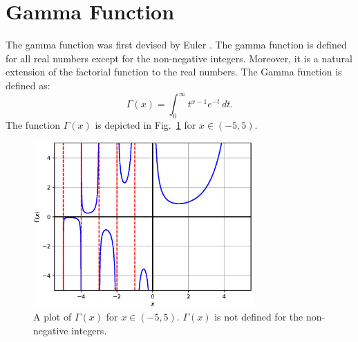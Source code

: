 \documentclass{article}
\theoremstyle{theorem}
\theoremstyle{definition}
\begin{document}
\section{Gamma Function}
The gamma function was first devised by Euler \cite{euler1738}. The gamma function is defined for all real numbers except for the non-negative integers. Moreover, it is a natural extension of the factorial function to the real numbers. The Gamma function is defined as:
\begin{equation}
\Gamma(x) = \int_0^{\infty} t^{x-1} e^{-t}\,dt.
\end{equation}
The function $\Gamma(x)$ is depicted in Fig.~\ref{fig:gamma} for $x\in(-5,5)$.
\begin{figure}[htb]
\centering
\includegraphics[width=0.75\textwidth]{gamma.eps}
\caption{A plot of $\Gamma(x)$ for $x\in(-5,5)$. $\Gamma(x)$ is not defined for the non-negative integers.}
\label{fig:gamma}
\end{figure}
\end{document}
